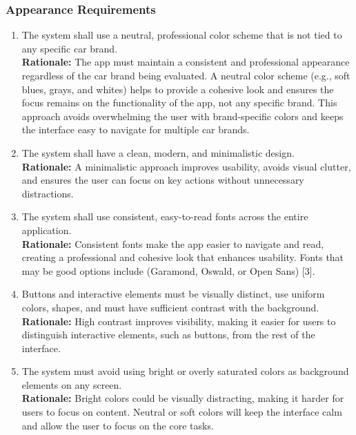 \documentclass[]{article}
\begin{document}
\subsubsection{Appearance Requirements}
\label{ssub:appearance_requirements}
\begin{enumerate}[{LF-A}1.]
    \item The system shall use a neutral, professional color scheme that is not tied to any specific car brand. \\
    \textbf{Rationale:} The app must maintain a consistent and professional appearance regardless of the car brand being evaluated. A neutral color scheme (e.g., soft blues, grays, and whites) helps to provide a cohesive look and ensures the focus remains on the functionality of the app, not any specific brand. This approach avoids overwhelming the user with brand-specific colors and keeps the interface easy to navigate for multiple car brands.
    
    \item The system shall have a clean, modern, and minimalistic design.  \\
    \textbf{Rationale:} A minimalistic approach improves usability, avoids visual clutter, and ensures the user can focus on key actions without unnecessary distractions.

    \item The system shall use consistent, easy-to-read fonts across the entire application. \\ 
    \textbf{Rationale:} Consistent fonts make the app easier to navigate and read, creating a professional and cohesive look that enhances usability. Fonts that may be good options include (Garamond, Oswald, or Open Sans) [3].

    \item  Buttons and interactive elements must be visually distinct, use uniform colors, shapes, and must have sufficient contrast with the background. \\ 
    \textbf{Rationale:} High contrast improves visibility, making it easier for users to distinguish interactive elements, such as buttons, from the rest of the interface.

    \item The system must avoid using bright or overly saturated colors as background elements on any screen.  \\
    \textbf{Rationale:} Bright colors could be visually distracting, making it harder for users to focus on content. Neutral or soft colors will keep the interface calm and allow the user to focus on the core tasks.
\end{enumerate}
\end{document}
